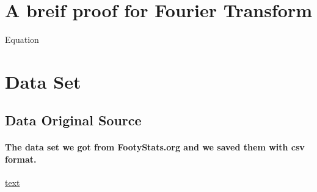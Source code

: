 % 
% 
\appendix
% 
\section{A breif proof for Fourier Transform}\label{sec:Fourier}
% 
Equation
% 
% 
% 
% 
% 
% 
\section{Data Set}
\subsection{Data Original Source}
\paragraph{The data set we got from FootyStats.org and we saved them with csv format.}
\href{URL}{text}
% 
% 
% 
% 
% 
% 
% 
% 
% 
% 
% 
% 
% 
% 
% 
% 
